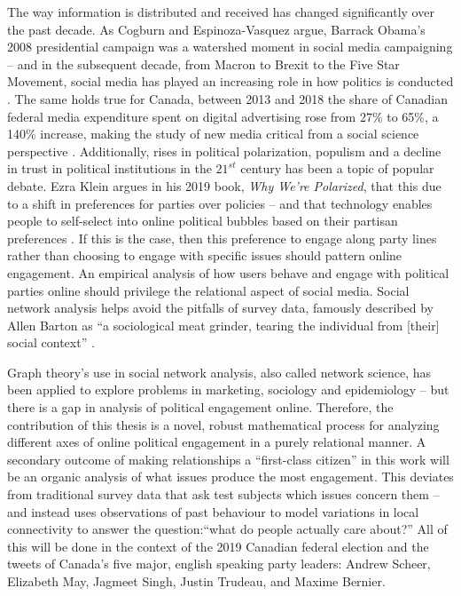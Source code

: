 The way information is distributed and received has changed significantly over
the past decade. As Cogburn and Espinoza-Vasquez argue, Barrack Obama’s 2008
presidential campaign was a watershed moment in social media campaigning -- and
in the subsequent decade, from Macron to Brexit to the Five Star Movement,
social media has played an increasing role in how politics is conducted
\cite{cogburn2011networked}. The same holds true for Canada, between 2013 and
2018 the share of Canadian federal media expenditure spent on digital
advertising rose from 27\% to 65\%, a 140\% increase, making the study of new
media critical from a social science perspective
\cite{annualReportCanadaAdvertisingActivities_2018}. Additionally, rises in
political polarization, populism and a decline in trust in political
institutions in the $21^{st}$ century has been a topic of popular debate. Ezra
Klein argues in his 2019 book, \emph{Why We're Polarized}, that this due to a
shift in preferences for parties over policies -- and that technology enables
people to self-select into online political bubbles based on their partisan
preferences \cite{levitsky2018democracies}. If this is the case, then this
preference to engage along party lines rather than choosing to engage with
specific issues should pattern online engagement. An empirical analysis of how
users behave and engage with political parties online should privilege the
relational aspect of social media. Social network analysis helps avoid the
pitfalls of survey data, famously described by Allen Barton as ``a sociological
meat grinder, tearing the individual from [their] social context''
\cite{freeman2004development}.

Graph theory’s use in social network analysis, also called network science, has
been applied to explore problems in marketing, sociology and epidemiology -- but
there is a gap in analysis of political engagement online. Therefore, the
contribution of this thesis is a novel, robust mathematical process for
analyzing different axes of online political engagement in a purely relational
manner. A secondary outcome of making relationships a “first-class citizen” in
this work will be an organic analysis of what issues produce the most
engagement. This deviates from traditional survey data that ask test subjects
which issues concern them -- and instead uses observations of past behaviour to
model variations in local connectivity to answer the question:“what do people
actually care about?” All of this will be done in the context of the 2019
Canadian federal election and the tweets of Canada's five major, english
speaking party leaders: Andrew Scheer, Elizabeth May, Jagmeet Singh, Justin
Trudeau, and Maxime Bernier. 

